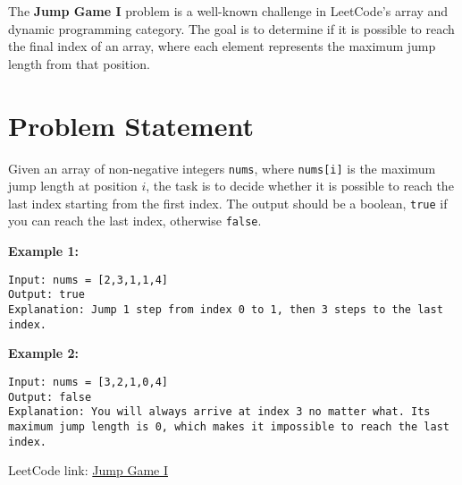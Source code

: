 
\label{problem:jump_game_i}

The \textbf{Jump Game I} problem is a well-known challenge in LeetCode's array and dynamic programming category. The goal is to determine if it is possible to reach the final index of an array, where each element represents the maximum jump length from that position.

\section*{Problem Statement}

Given an array of non-negative integers \texttt{nums}, where \texttt{nums[i]} is the maximum jump length at position \(i\), the task is to decide whether it is possible to reach the last index starting from the first index. The output should be a boolean, \texttt{true} if you can reach the last index, otherwise \texttt{false}.

\textbf{Example 1:}
\begin{verbatim}
Input: nums = [2,3,1,1,4]
Output: true
Explanation: Jump 1 step from index 0 to 1, then 3 steps to the last index.
\end{verbatim}

\textbf{Example 2:}
\begin{verbatim}
Input: nums = [3,2,1,0,4]
Output: false
Explanation: You will always arrive at index 3 no matter what. Its maximum jump length is 0, which makes it impossible to reach the last index.
\end{verbatim}

LeetCode link: \href{https://leetcode.com/problems/jump-game/}{Jump Game I}


